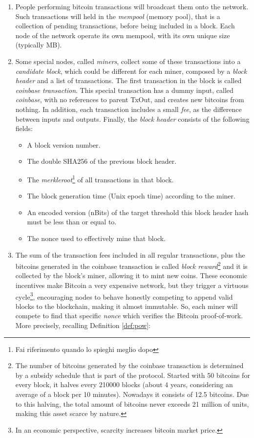 \begin{enumerate}
    \item People performing bitcoin transactions will broadcast them onto the network. Such transactions will held in the \textit{mempool} (memory pool), that is a collection of pending transactions, before being included in a block. Each node of the network operate its own mempool, with its own unique size (typically MB).
    \item Some special nodes, called \textit{miners}, collect some of these transactions into a \textit{candidate block}, which could be different for each miner, composed by a \textit{block header} and a list of transactions. The first transaction in the block is called \textit{coinbase transaction}. This special transaction has a dummy input, called \textit{coinbase}, with no references to parent TxOut, and creates new bitcoins from nothing. In addition, each transaction includes a small \textit{fee}, as the difference between inputs and outputs. Finally, the \textit{block header} consists of the following fields:
    \begin{itemize}
        \item A block version number.
        \item The double SHA256 of the previous block header.
        \item The \textit{merkleroot}\textup{\footnote{Fai riferimento quando lo spieghi meglio dopo}} of all transactions in that block.
        \item The block generation time (Unix epoch time) according to the miner.
        \item An encoded version (nBits) of the target threshold this block header hash must be less than or equal to.
        \item The nonce used to effectively mine that block.
    \end{itemize}
    \item The sum of the transaction fees included in all regular transactions, plus the bitcoins generated in the coinbase transaction is called \textit{block reward}\textup{\footnote{The number of bitcoins generated by the coinbase transaction is determined by a subsidy schedule that is part of the protocol. Started with 50 bitcoins for every block, it halves every 210000 blocks (about 4 years, considering an average of a block per 10 minutes). Nowadays it consists of 12.5 bitcoins. Due to this halving, the total amount of bitcoins never exceeds 21 million of units, making this asset scarce by nature.}} and it is collected by the block's miner, allowing it to mint new coins. These economic incentives make Bitcoin a very expensive network, but they trigger a virtuous cycle\footnote{In an economic perspective, scarcity increases bitcoin market price.}, encouraging nodes to behave honestly competing to append valid blocks to the blockchain, making it almost immutable. So, each miner will compete to find that specific \textit{nonce} which verifies the Bitcoin proof-of-work. More precisely, recalling Definition \ref{def:pow}:
    

\end{enumerate}
